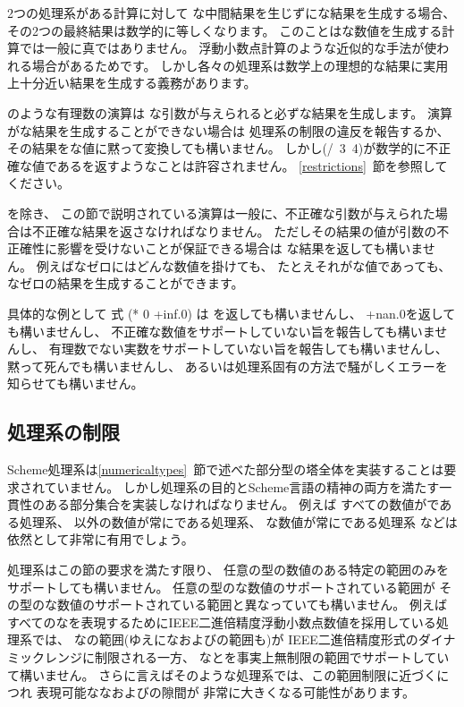 \vest 2つの処理系がある計算に対して
な中間結果を生じずにな結果を生成する場合、
その2つの最終結果は数学的に等しくなります。
このことはな数値を生成する計算では一般に真ではありません。
浮動小数点計算のような近似的な手法が使われる場合があるためです。
しかし各々の処理系は数学上の理想的な結果に実用上十分近い結果を生成する義務があります。

\vest {\cf +}のような有理数の演算は
な引数が与えられると必ずな結果を生成します。
演算がな結果を生成することができない場合は
処理系の制限の違反を報告するか、
その結果をな値に黙って変換しても構いません。
しかし{\cf (/~3~4)}が数学的に不正確な値である{}を返すようなことは許容されません。
\ref{restrictions}~節を参照してください。

\vest {}を除き、
この節で説明されている演算は一般に、不正確な引数が与えられた場合は不正確な結果を返さなければなりません。
ただしその結果の値が引数の不正確性に影響を受けないことが保証できる場合は
な結果を返しても構いません。
例えばなゼロにはどんな数値を掛けても、
たとえそれがな値であっても、
なゼロの結果を生成することができます。

具体的な例として
式 {\cf (* 0 +inf.0)} は
{}を返しても構いませんし、
{\cf +nan.0}を返しても構いませんし、
不正確な数値をサポートしていない旨を報告しても構いませんし、
有理数でない実数をサポートしていない旨を報告しても構いませんし、
黙って死んでも構いませんし、
あるいは処理系固有の方法で騒がしくエラーを知らせても構いません。

\subsection{処理系の制限}

\label{restrictions}

\vest Scheme処理系は\ref{numericaltypes}~節で述べた部分型の塔全体を実装することは要求されていません。
しかし処理系の目的とScheme言語の精神の両方を満たす一貫性のある部分集合を実装しなければなりません。
例えば
すべての数値がである処理系、
以外の数値が常にである処理系、
な数値が常にである処理系
などは依然として非常に有用でしょう。

\vest 処理系はこの節の要求を満たす限り、
任意の型の数値のある特定の範囲のみをサポートしても構いません。
任意の型のな数値のサポートされている範囲が
その型のな数値のサポートされている範囲と異なっていても構いません。
例えば
すべてのなを表現するためにIEEE二進倍精度浮動小数点数値を採用している処理系では、
なの範囲(ゆえになおよびの範囲も)が
IEEE二進倍精度形式のダイナミックレンジに制限される一方、
なとを事実上無制限の範囲でサポートしていて構いません。
さらに言えばそのような処理系では、この範囲制限に近づくにつれ
表現可能ななおよびの隙間が
非常に大きくなる可能性があります。

